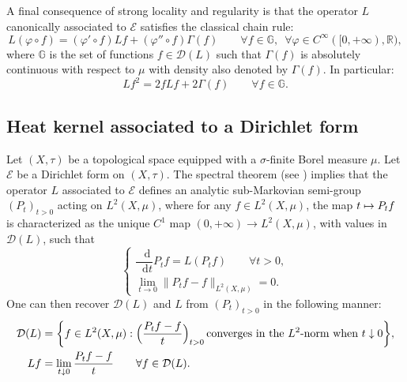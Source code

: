\documentclass[JEP,XML,SOM,Unicode,published]{cedram}
\newcommand\mto{\mathchoice{\longmapsto}{\mapsto}{\mapsto}{\mapsto}}
\let\sep:
\theoremstyle{plain}
\theoremstyle{definition}
\newcommand{\setR}{\mathbb{R}}
\newcommand{\cE}{\mathcal{E}}
\newcommand{\cD}{\mathcal{D}}
\let\phi\varphi
\newcommand{\di}{\mathop{}\!\mathrm{d}}
\begin{document}
A final consequence of strong locality and regularity is that the operator $L$ canonically associated to $\cE$ satisfies the classical chain rule:
\begin{equation}\label{eq:chainrule}
L(\phi \circ f) = (\phi' \circ f) Lf + (\phi''\circ f) \Gamma(f) \qquad \forall f \in \mathbb{G}, \,\, \, \forall \phi \in C^\infty([0,+\infty),\setR),
\end{equation}
where $\mathbb{G}$ is the set of functions $f \in \cD(L)$ such that $\Gamma(f)$ is absolutely continuous with respect to $\mu$ with density also denoted by $\Gamma(f)$. In particular:
\begin{equation}\label{eq:chainrulesquare}
Lf^2 = 2fLf + 2 \Gamma(f) \qquad \forall f \in \mathbb{G}.
\end{equation}

\subsection*{Heat kernel associated to a Dirichlet form}

Let $(X,\tau)$ be a topological space equipped with a $\sigma$-finite Borel measure $\mu$. Let $\cE$ be a Dirichlet form on $(X,\tau)$. The spectral theorem (see \eg \cite[Th.\,VIII.5]{ReedSimon}) implies that the operator $L$ associated to $\cE$ defines an analytic sub-Markovian semi-group $(P_t)_{t>0}$ acting on $L^2(X,\mu)$, where for any $f \in L^2(X,\mu)$, the map $t \mto P_tf$ is characterized as the unique $C^1$ map $(0,+\infty)\to L^2(X,\mu)$, with values in $\cD(L)$, such that\vspace*{-3pt}
\[
\begin{cases}
\dfrac{\di}{\di t} P_tf = L(P_t f) \qquad \forall t>0,\\
\lim_{t \to 0} \|P_t f - f\|_{L^2(X,\mu)}=0.
\end{cases}
\]
One can then recover $\cD(L)$ and $L$ from $(P_t)_{t>0}$ in the following manner:\vspace*{-3pt}
\begin{align*}
\cD(L)&=\biggl\{f \in L^2(X,\mu) \sep \Bigl(\frac{P_t f - f}{t}\Bigr)_{t>0} \, \text{converges in the $L^2$-norm when $t\downarrow 0$} \biggr\},\\
Lf &= \lim_{t \downarrow 0} \frac{P_t f-f}{t} \qquad \forall f \in \cD(L).
\end{align*}
\end{document}
